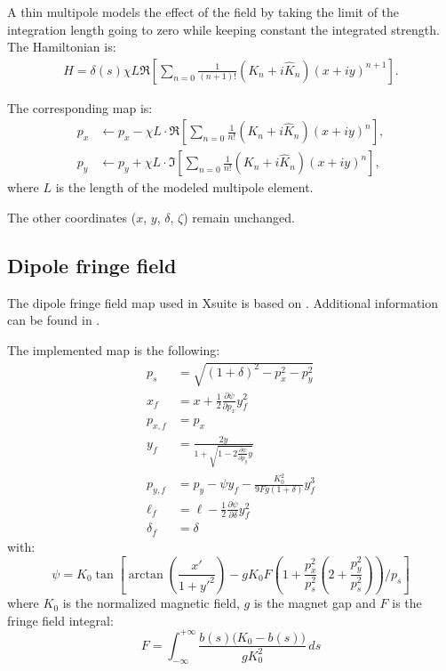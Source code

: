 A thin multipole models the effect of the field by taking the limit of the integration
length going to zero while keeping constant the integrated strength. The Hamiltonian is:
\begin{align}
  H= \delta(s) \chi L \Re\left[\sum_{n=0} \frac{1}{(n+1)!}(K_n + i\hat K_n) (x+iy)^{n+1} \right].
\end{align}

The corresponding map is:
\begin{align}
  p_x &\leftarrow p_x - \chi L\cdot\Re\left[\sum_{n=0} \frac{1}{n!} (K_n + i\hat K_n) (x+iy)^n \right], \\
  p_y &\leftarrow p_y + \chi L\cdot\Im\left[\sum_{n=0} \frac{1}{n!} (K_n + i\hat K_n) (x+iy)^n \right],
\end{align}
where $L$ is the length of the modeled multipole element.

The other coordinates ($x$, $y$, $\delta$, $\zeta$) remain unchanged.

\subsection{Dipole fringe field} \label{sec:DipoleFringeField}

The dipole fringe field map used in Xsuite is based on \cite{forest-fringe-1}.
Additional information can be found in \cite{silke_cap, silke_fringe}.

The implemented map is the following:
\begin{equation}
\begin{aligned}
p_s &= \sqrt{(1+\delta)^2 - p_x^2 - p_y^2}\\
x_f &= x + \frac{1}{2} \frac{\partial \psi}{\partial p_x} y_f^2 \\
p_{x,f} &= p_x \\
y_f &= \frac{2y}{1 + \sqrt{1 - 2 \frac{\partial \psi}{\partial p_y} y}} \\
p_{y,f} &= p_y - \psi y_f - \frac{K_0^2}{9 F g (1 + \delta)} y_f^3 \\
\ell_f &= \ell - \frac{1}{2} \frac{\partial \psi}{\partial \delta} y_f^2 \\
\delta_f &= \delta
\end{aligned}
\label{eq:fringe_map}
\end{equation}
%
with:
\begin{equation}
\psi = K_0 \tan \left[
\arctan \left( \frac{x'}{1 + y'^2} \right)
- g K_0 F \left( 1 + \frac{p_x^2}{p_s^2} \left( 2 + \frac{p_y^2}{p_s^2} \right) \right) / p_s
\right]
\label{eq:fringe_psi}
\end{equation}
where $K_0$ is the normalized magnetic field, $g$ is the magnet gap and $F$ is
the fringe field integral:
\begin{equation}
F = \int_{-\infty}^{+\infty} \frac{b(s)\bigl(K_0 - b(s)\bigr)}{g K_0^{2}} \, ds
\end{equation}

